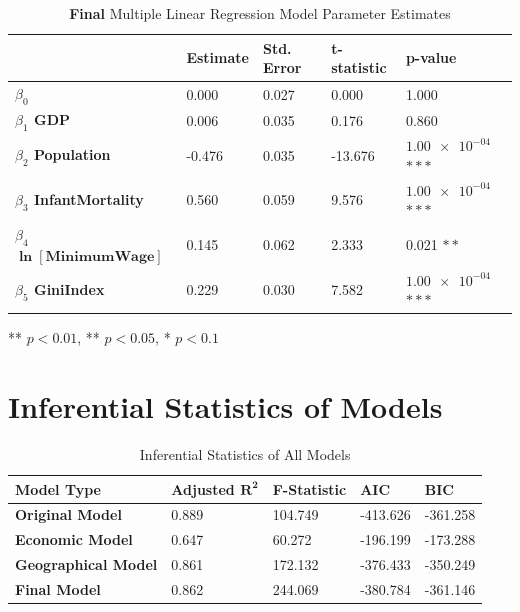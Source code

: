 \documentclass{article}
\begin{document}
\begin{appendices}
\begin{table}[H]
    \centering
        \begin{threeparttable}
            \begin{tabular}{l l l l l}
              \toprule & \textbf{Estimate} & \textbf{Std. Error} & \textbf{t-statistic} & \textbf{p-value} \\ \midrule
            \textbf{$\beta_0$} & 0.000 & 0.027 & 0.000 & 1.000 \\ 
            \textbf{$\beta_1$ GDP} & 0.006 & 0.035 & 0.176 & 0.860  \\ 
            \textbf{$\beta_2$ Population} & -0.476 & 0.035 & -13.676 & $\num{1.00e-04}$ $***$ \\ 
            \textbf{$\beta_3$ InfantMortality} & 0.560 & 0.059 & 9.576 & $\num{1.00e-04}$ $***$ \\ 
            \textbf{$\beta_4$ $\bm{\ln{[\text{MinimumWage}]}}$} & 0.145 & 0.062 & 2.333 & 0.021 $**$ \\ 
            \textbf{$\beta_5$ GiniIndex} & 0.229 & 0.030 & 7.582 & $\num{1.00e-04}$ $***$ \\ \bottomrule
            \end{tabular}
            \begin{tablenotes}
                \small
                \item *** $p < 0.01$, ** $p < 0.05$, * $p < 0.1$
            \end{tablenotes}
        \end{threeparttable}
    \caption{\label{table: descriptivestatsfinal}\textbf{Final} Multiple Linear Regression Model Parameter Estimates}
\end{table}

\section{Inferential Statistics of Models}\label{AppC}
\begin{table}[H]
    \centering
        \begin{threeparttable}
            \begin{tabular}{l l l l l}
              \toprule \textbf{Model Type} & \textbf{Adjusted $\bm{R^2}$} & \textbf{F-Statistic} & \textbf{AIC} & \textbf{BIC} \\ \midrule
            \textbf{Original Model} & 0.889 & 104.749 & -413.626 & -361.258 \\ 
            \textbf{Economic Model} & 0.647 & 60.272 & -196.199 & -173.288  \\ 
            \textbf{Geographical Model} & 0.861 & 172.132 & -376.433 & -350.249 \\ 
            \textbf{Final Model} & 0.862 & 244.069 & -380.784 & -361.146 \\ \bottomrule
            \end{tabular}
        \end{threeparttable}
    \caption{\label{table: infstatsallmodel}Inferential Statistics of All Models}
\end{table}


\end{appendices}
\end{document}
